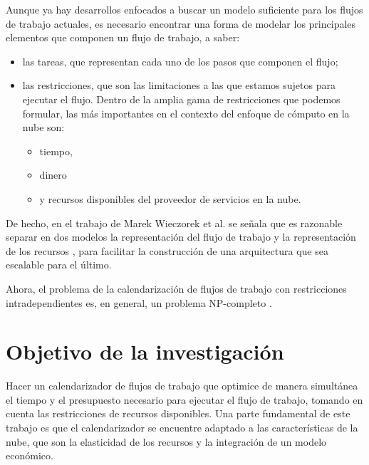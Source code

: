 \documentclass[letterpaper, 12pt]{report}
\begin{document}
Aunque ya hay desarrollos enfocados a buscar un modelo suficiente para los flujos de trabajo actuales, es necesario encontrar una forma de modelar los principales elementos que componen un flujo de trabajo, a saber: 
\begin{itemize}
\item las tareas, que representan cada uno de los pasos que componen el flujo;
\item las restricciones, que son las limitaciones a las que estamos sujetos para ejecutar el flujo. Dentro de la amplia gama de restricciones que podemos formular, las más importantes en el contexto del enfoque de cómputo en la nube son:
  \begin{itemize}
  \item tiempo,
  \item dinero 
  \item y recursos disponibles del proveedor de servicios en la nube.
  \end{itemize}
\end{itemize}
De hecho, en el trabajo de Marek Wieczorek et al. se señala que es razonable separar en dos modelos la representación del flujo de trabajo y la representación de los recursos \cite{wieczorek2009towards}, para facilitar la construcción de una arquitectura que sea escalable para el último.

Ahora, el problema de la calendarización de flujos de trabajo con restricciones intradependientes es, en general, un problema NP-completo \cite{wieczorek2009towards}. %

\section*{Objetivo de la investigación}
Hacer un calendarizador de flujos de trabajo que optimice de manera simultánea el tiempo y el presupuesto necesario para ejecutar el flujo de trabajo, tomando en cuenta las restricciones de recursos disponibles. Una parte fundamental de este trabajo es que el calendarizador se encuentre adaptado a las características de la nube, que son la elasticidad de los recursos y la integración de un modelo económico.
\end{document}
